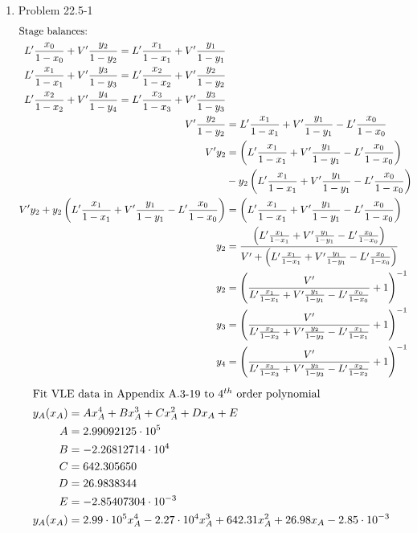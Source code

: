 \documentclass[12pt]{article}
\begin{document}
\begin{enumerate}
\newpage
    \item Problem 22.5-1
    \begin{align*}
        \intertext{Stage balances:}
        L' \frac{x_0}{1-x_0} + V' \frac{y_2}{1-y_2} = L' \frac{x_1}{1-x_1} + V' \frac{y_1}{1-y_1} \\
        L' \frac{x_1}{1-x_1} + V' \frac{y_3}{1-y_3} = L' \frac{x_2}{1-x_2} + V' \frac{y_2}{1-y_2} \\
        L' \frac{x_2}{1-x_2} + V' \frac{y_4}{1-y_4} = L' \frac{x_3}{1-x_3} + V' \frac{y_3}{1-y_3} \\
        V' \frac{y_2}{1-y_2} &= L' \frac{x_1}{1-x_1} + V' \frac{y_1}{1-y_1} - L' \frac{x_0}{1-x_0} \\
        V' y_2 &= \left(L' \frac{x_1}{1-x_1} + V' \frac{y_1}{1-y_1} - L' \frac{x_0}{1-x_0}\right) \\
        & - y_2 \left(L' \frac{x_1}{1-x_1} + V' \frac{y_1}{1-y_1} - L' \frac{x_0}{1-x_0}\right) \\
        V' y_2 + y_2 \left(L' \frac{x_1}{1-x_1} + V' \frac{y_1}{1-y_1} - L' \frac{x_0}{1-x_0}\right) &= \left(L' \frac{x_1}{1-x_1} + V' \frac{y_1}{1-y_1} - L' \frac{x_0}{1-x_0}\right) \\
        y_2 &= \frac{\left(L' \frac{x_1}{1-x_1} + V' \frac{y_1}{1-y_1} - L' \frac{x_0}{1-x_0}\right)}{V' + \left(L' \frac{x_1}{1-x_1} + V' \frac{y_1}{1-y_1} - L' \frac{x_0}{1-x_0}\right)} \\
        y_2 &= \left(\frac{V'}{L' \frac{x_1}{1-x_1} + V' \frac{y_1}{1-y_1} - L' \frac{x_0}{1-x_0}} + 1\right)^{-1} \\
        y_3 &= \left(\frac{V'}{L' \frac{x_2}{1-x_2} + V' \frac{y_2}{1-y_2} - L' \frac{x_1}{1-x_1}} + 1\right)^{-1} \\
        y_4 &= \left(\frac{V'}{L' \frac{x_3}{1-x_3} + V' \frac{y_3}{1-y_3} - L' \frac{x_2}{1-x_2}} + 1\right)^{-1} \\
    \end{align*}
    \begin{align*}
        \intertext{Fit VLE data in Appendix A.3-19 to 4$^{th}$ order polynomial}
        y_A(x_A) &= A x_A^4 + B x_A^3 + C x_A^2 + D x_A + E \\
        A &= 2.99092125 \cdot 10^5\\
        B &=  -2.26812714 \cdot 10^4\\
        C &= 642.305650 \\
        D &= 26.9838344 \\
        E &= - 2.85407304 \cdot 10^{-3} \\
        y_A(x_A) &= 2.99 \cdot 10^5 x_A^4 - 2.27 \cdot 10^4 x_A^3 + 642.31 x_A^2 + 26.98 x_A - 2.85 \cdot 10^{-3}
    \end{align*}



\end{enumerate}
\end{document}
